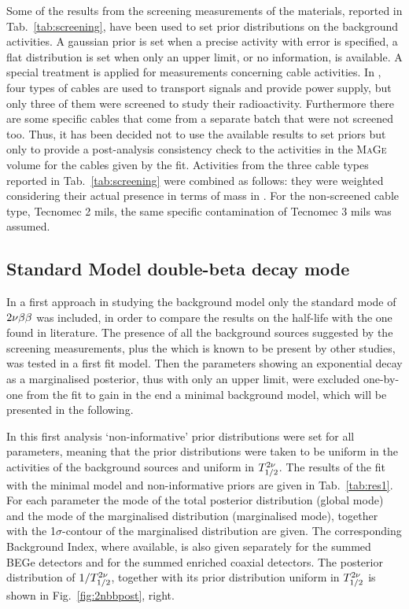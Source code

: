 Some of the results from the screening measurements of the materials, reported in Tab.~\ref{tab:screening}, have been used to set prior distributions on the background activities. A gaussian prior is set when a precise activity with error is specified, a flat distribution is set when only an upper limit, or no information, is available. A special treatment is applied for measurements concerning cable activities. In {\gerda}, four types of cables are used to transport signals and provide power supply, but only three of them were screened to study their radioactivity. Furthermore there are some specific cables that come from a separate batch that were not screened too. Thus, it has been decided not to use the available results to set priors but only to provide a post-analysis consistency check to the activities in the \textsc{MaGe} volume for the cables given by the fit. Activities from the three cable types reported in Tab.~\ref{tab:screening} were combined as follows: they were weighted considering their actual presence in terms of mass in {\gerda}. For the non-screened cable type, Tecnomec 2 mils, the same specific contamination of Tecnomec 3 mils was assumed.

\subsection*{Standard Model double-beta decay mode}
In a first approach in studying the background model only the standard mode of $2\nu\beta\beta$ was included, in order to compare the results on the half-life with the one found in literature. The presence of all the background sources suggested by the screening measurements, plus the  which is known to be present by other studies, was tested in a first fit model. Then the parameters showing an exponential decay as a marginalised posterior, thus with only an upper limit, were excluded one-by-one from the fit to gain in the end a minimal background model, which will be presented in the following.

 In this first analysis `non-informative' prior distributions were set for all parameters, meaning that the prior distributions were taken to be uniform in the activities of the background sources and uniform in $T_{1/2}^{2\nu}$. The results of the fit with the minimal model and non-informative priors are given in Tab.~\ref{tab:res1}. For each parameter the mode of the total posterior distribution (global mode) and the mode of the marginalised distribution (marginalised mode), together with the 1$\sigma$-contour of the marginalised distribution are given. The corresponding Background Index, where available, is also given separately for the summed BEGe detectors and for the summed enriched coaxial detectors. The posterior distribution of $1/T_{1/2}^{2\nu}$, together with its prior distribution uniform in $T_{1/2}^{2\nu}$ is shown in Fig.~\ref{fig:2nbbpost}, right.

